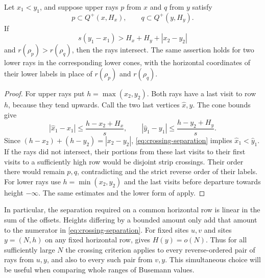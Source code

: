 \begin{lemma}\label{lem:crossing}
Let $x_1<y_1$, and suppose upper rays $p$ from $x$ and $q$ from $y$ satisfy
\[
 p\subset Q^+(x,H_x),\qquad q\subset Q^+(y,H_y).
\]
If
\begin{equation}\label{eq:crossing-separation}
 s(y_1-x_1)>H_x+H_y+|x_2-y_2|
\end{equation}
and $r(\rho_p)>r(\rho_q)$, then the rays intersect.  The same assertion
holds for two lower rays in the corresponding lower cones, with the
horizontal coordinates of their lower labels in place of $r(\rho_p)$
and $r(\rho_q)$.
\end{lemma}

\begin{proof}
For upper rays put $h=\max(x_2,y_2)$.  Both rays have a last visit to
row $h$, because they tend upwards.  Call the two last vertices
$\widehat x,\widehat y$.  The cone bounds give
\[
 |\widehat x_1-x_1|\leq\frac{h-x_2+H_x}{s},\qquad
 |\widehat y_1-y_1|\leq\frac{h-y_2+H_y}{s}.
\]
Since $(h-x_2)+(h-y_2)=|x_2-y_2|$,
\eqref{eq:crossing-separation} implies
$\widehat x_1<\widehat y_1$.  If the rays did not intersect, their
portions from these last visits to their first visits to a sufficiently
high row would be disjoint strip crossings.  Their order there would
remain $p,q$, contradicting  and the strict reverse
order of their labels.  For lower rays use
$h=\min(x_2,y_2)$ and the last visits before departure towards height
$-\infty$.  The same estimates and the lower form of
 apply.
\end{proof}

In particular, the separation required on a common horizontal row is
linear in the sum of the offsets.  Heights differing by a bounded
amount only add that amount to the numerator in
\eqref{eq:crossing-separation}.  For fixed sites $u,v$ and sites
$y=(N,h)$ on any fixed horizontal row,  gives
$H(y)=o(N)$.  Thus for all sufficiently large $N$ the crossing criterion
applies to every reverse-ordered pair of rays from $u,y$, and also to
every such pair from $v,y$.  This simultaneous choice will be useful
when comparing whole ranges of Busemann values.

